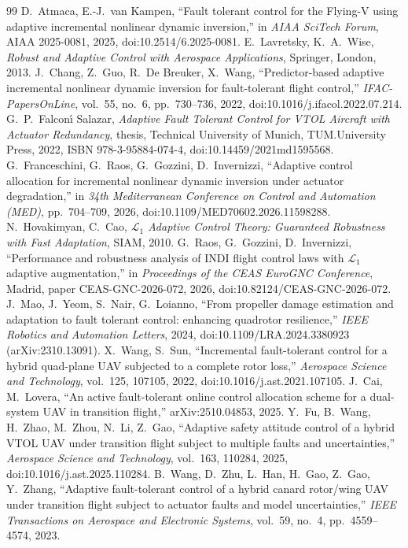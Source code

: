\documentclass[preprint,12pt,a4paper]{elsarticle}
\begin{document}
\begin{thebibliography}{99}
 D.~Atmaca, E.-J.~van Kampen, ``Fault tolerant control for the Flying-V using adaptive incremental nonlinear dynamic inversion,'' in \emph{AIAA SciTech Forum}, AIAA 2025-0081, 2025, doi:10.2514/6.2025-0081.
 E.~Lavretsky, K.~A.~Wise, \emph{Robust and Adaptive Control with Aerospace Applications}, Springer, London, 2013.
 J.~Chang, Z.~Guo, R.~De Breuker, X.~Wang, ``Predictor-based adaptive incremental nonlinear dynamic inversion for fault-tolerant flight control,'' \emph{IFAC-PapersOnLine}, vol.~55, no.~6, pp.~730--736, 2022, doi:10.1016/j.ifacol.2022.07.214.
 G.~P.~Falcon\'{\i} Salazar, \emph{Adaptive Fault Tolerant Control for VTOL Aircraft with Actuator Redundancy}, thesis, Technical University of Munich, TUM.University Press, 2022, ISBN 978-3-95884-074-4, doi:10.14459/2021md1595568.
 G.~Franceschini, G.~Raos, G.~Gozzini, D.~Invernizzi, ``Adaptive control allocation for incremental nonlinear dynamic inversion under actuator degradation,'' in \emph{34th Mediterranean Conference on Control and Automation (MED)}, pp.~704--709, 2026, doi:10.1109/MED70602.2026.11598288.
 N.~Hovakimyan, C.~Cao, \emph{$\mathcal{L}_1$ Adaptive Control Theory: Guaranteed Robustness with Fast Adaptation}, SIAM, 2010.
 G.~Raos, G.~Gozzini, D.~Invernizzi, ``Performance and robustness analysis of INDI flight control laws with $\mathcal{L}_1$ adaptive augmentation,'' in \emph{Proceedings of the CEAS EuroGNC Conference}, Madrid, paper CEAS-GNC-2026-072, 2026, doi:10.82124/CEAS-GNC-2026-072.
 J.~Mao, J.~Yeom, S.~Nair, G.~Loianno, ``From propeller damage estimation and adaptation to fault tolerant control: enhancing quadrotor resilience,'' \emph{IEEE Robotics and Automation Letters}, 2024, doi:10.1109/LRA.2024.3380923 (arXiv:2310.13091).
 X.~Wang, S.~Sun, ``Incremental fault-tolerant control for a hybrid quad-plane UAV subjected to a complete rotor loss,'' \emph{Aerospace Science and Technology}, vol.~125, 107105, 2022, doi:10.1016/j.ast.2021.107105.
 J.~Cai, M.~Lovera, ``An active fault-tolerant online control allocation scheme for a dual-system UAV in transition flight,'' arXiv:2510.04853, 2025.
 Y.~Fu, B.~Wang, H.~Zhao, M.~Zhou, N.~Li, Z.~Gao, ``Adaptive safety attitude control of a hybrid VTOL UAV under transition flight subject to multiple faults and uncertainties,'' \emph{Aerospace Science and Technology}, vol.~163, 110284, 2025, doi:10.1016/j.ast.2025.110284.
 B.~Wang, D.~Zhu, L.~Han, H.~Gao, Z.~Gao, Y.~Zhang, ``Adaptive fault-tolerant control of a hybrid canard rotor/wing UAV under transition flight subject to actuator faults and model uncertainties,'' \emph{IEEE Transactions on Aerospace and Electronic Systems}, vol.~59, no.~4, pp.~4559--4574, 2023.

\end{thebibliography}
\end{document}
